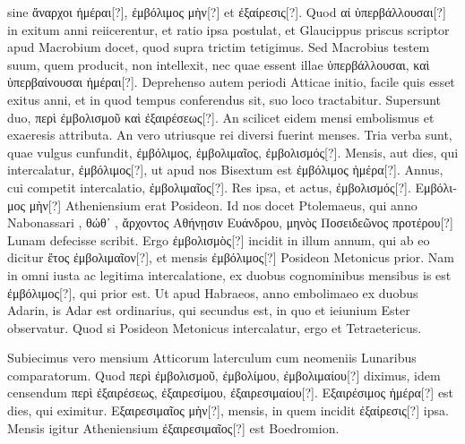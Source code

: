 sine \textgreek{ἄναρχοι ἡμέραι[?]},
\textgreek{ἐμβόλιμος μὴν[?]} et \textgreek{ἐξαίρεσις[?]}.
Quod \textgreek{αί ὑπερβάλλουσαι[?]} in exitum anni reiicerentur,
et ratio ipsa postulat, et Glaucippus priscus scriptor apud
Macrobium docet, quod supra trictim tetigimus.
Sed Macrobius testem
suum, quem producit, non intellexit, nec quae essent illae
 \textgreek{ὑπερβάλλουσαι,
καὶ ὑπερβαίνουσαι ἡμέραι[?]}.
Deprehenso autem periodi Atticae
initio, facile quis esset exitus anni, et in quod tempus conferendus
sit, suo loco tractabitur.
Supersunt duo, \textgreek{περὶ ἐμβολισμοῦ καὶ ἐξαιρέσεως[?]}.
An scilicet eidem mensi embolismus et exaeresis attributa.
An
vero utriusque rei diversi fuerint menses.
Tria verba sunt, quae vulgus
cunfundit, \textgreek{ἐμβόλιμος, ἐμβολιμαῖος, ἐμβολισμός[?]}.
Mensis, aut
dies, qui intercalatur, \textgreek{ἐμβόλιμος[?]},
 ut apud nos Bisextum est \textgreek{ἐμβόλιμος
ἡμέρα[?]}.
%
Annus, cui competit intercalatio, \textgreek{ἐμβολιμαῖος[?]}.
Res ipsa, et
actus, \textgreek{ἐμβολισμός[?]}.
\textgreek{Εμβόλιμος μὴν[?]} Atheniensium erat Posideon.
Id nos
docet Ptolemaeus, qui anno Nabonassari ,
 \textgreek{θώθ᾽ , ἄρχοντος
Αθήνῃσιν Ευάνδρου, μηνὸς Ποσειδεῶνος προτέρου[?]} Lunam defecisse scribit.
Ergo \textgreek{ἐμβολισμὸς[?]} incidit in illum annum, qui ab eo dicitur
 \textgreek{ἔτος ἐμβολιμαῖον[?]},
et mensis \textgreek{ἐμβόλιμος[?]} Posideon Metonicus prior.
Nam in omni
iusta ac legitima intercalatione, ex duobus
cognominibus mensibus is est \textgreek{ἐμβόλιμος[?]},
qui prior est.
Ut apud Habraeos, anno
embolimaeo ex duobus Adarin, is Adar
est ordinarius, qui secundus est, in quo et
ieiunium Ester observatur.
Quod si Posideon
Metonicus intercalatur, ergo et Tetraetericus.
\begin{table}[htbp]
  
\end{table}
Subiecimus vero mensium Atticorum
laterculum cum neomeniis Lunaribus
comparatorum.
Quod \textgreek{περὶ ἐμβολισμοῦ,
ἐμβολίμου, ἐμβολιμαίου[?]} diximus,
idem censendum \textgreek{περὶ ἐξαιρέσεως, ἐξαιρεσίμου,
ἐξαιρεσιμαίου[?]}.
\textgreek{Εξαιρέσιμος ἡμέρα[?]} est dies, qui eximitur.
\textgreek{Εξαιρεσιμαῖος
μὴν[?]}, mensis, in quem incidit \textgreek{ἐξαίρεσις[?]} ipsa.
Mensis igitur Atheniensium
\textgreek{ἐξαιρεσιμαῖος[?]} est Boedromion.
